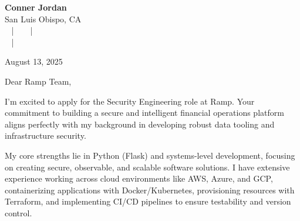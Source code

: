 \documentclass[letterpaper,11pt]{article}
\begin{document}
\begin{center}
  {\Huge \textbf{Conner Jordan}}\\[4pt]
  {\Large San Luis Obispo, CA}\\[4pt]
  \href{tel:+18059759793}{
    } ~ | ~
  \href{mailto:connercharlesjordan@gmail.com}{
    } ~ | ~
   \\
  \href{https://www.linkedin.com/in/conner-jordan-4b268514a/}{
    } ~ | ~
  \href{https://github.com/cjordan223}{
    }
\end{center}



\vspace{16pt}

\begin{flushright}
August 13, 2025
\end{flushright}



Dear Ramp Team,

\vspace{16pt}

I'm excited to apply for the Security Engineering role at Ramp. Your commitment to building a secure and intelligent financial operations platform aligns perfectly with my background in developing robust data tooling and infrastructure security.

\vspace{16pt}

My core strengths lie in Python (Flask) and systems-level development, focusing on creating secure, observable, and scalable software solutions. I have extensive experience working across cloud environments like AWS, Azure, and GCP, containerizing applications with Docker/Kubernetes, provisioning resources with Terraform, and implementing CI/CD pipelines to ensure testability and version control.

\vspace{16pt}
\end{document}
